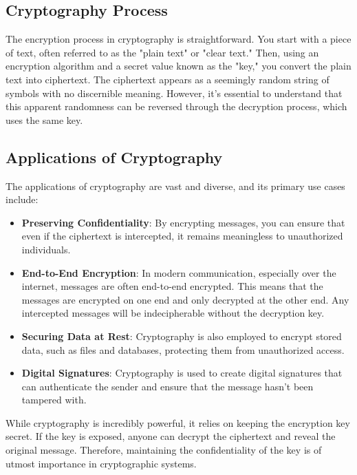 \documentclass{class}
\begin{document}
\subsection{Cryptography Process}

The encryption process in cryptography is straightforward. You start with a piece of text, often referred to as the "plain text" or "clear text."
Then, using an encryption algorithm and a secret value known as the "key," you convert the plain text into ciphertext.
The ciphertext appears as a seemingly random string of symbols with no discernible meaning.
However, it's essential to understand that this apparent randomness can be reversed through the decryption process, which uses the same key.

\subsection{Applications of Cryptography}

The applications of cryptography are vast and diverse, and its primary use cases include:

\begin{itemize}
      \item \textbf{Preserving Confidentiality}: By encrypting messages, you can ensure that even if the ciphertext is intercepted, it remains meaningless to unauthorized individuals.
      \item \textbf{End-to-End Encryption}: In modern communication, especially over the internet, messages are often end-to-end encrypted. This means that the messages are encrypted on one end and only decrypted at the other end. Any intercepted messages will be indecipherable without the decryption key.
      \item \textbf{Securing Data at Rest}: Cryptography is also employed to encrypt stored data, such as files and databases, protecting them from unauthorized access.
      \item \textbf{Digital Signatures}: Cryptography is used to create digital signatures that can authenticate the sender and ensure that the message hasn't been tampered with.
\end{itemize}

While cryptography is incredibly powerful, it relies on keeping the encryption key secret. If the key is exposed, anyone can decrypt the ciphertext and reveal the original message. Therefore, maintaining the confidentiality of the key is of utmost importance in cryptographic systems.
\end{document}
